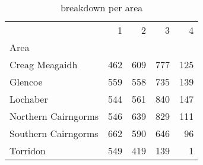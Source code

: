 \begin{table}[h]
\caption{ breakdown per area}
\label{tbl:sais_mapped_hazard_breakdown_per_area}
\begin{tabular}{lrrrr}
\toprule
 & 1 & 2 & 3 & 4 \\
Area &  &  &  &  \\
\midrule
Creag Meagaidh & 462 & 609 & 777 & 125 \\
Glencoe & 559 & 558 & 735 & 139 \\
Lochaber & 544 & 561 & 840 & 147 \\
Northern Cairngorms & 546 & 639 & 829 & 111 \\
Southern Cairngorms & 662 & 590 & 646 & 96 \\
Torridon & 549 & 419 & 139 & 1 \\
\bottomrule
\end{tabular}
\end{table}
